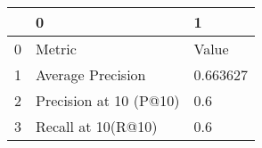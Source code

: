 \begin{tabular}{lll}
\toprule
{} &                       0 &         1 \\
\midrule
0 &                  Metric &     Value \\
1 &       Average Precision &  0.663627 \\
2 &  Precision at 10 (P@10) &       0.6 \\
3 &      Recall at 10(R@10) &       0.6 \\
\bottomrule
\end{tabular}
